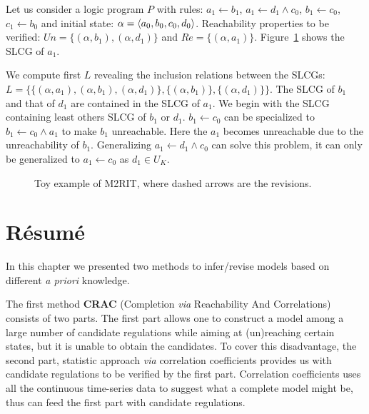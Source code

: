 \begin{example}
Let us consider a logic program $P$ with rules: $a_1\gets b_1$, $a_1\gets d_1 \land c_0$, $b_1\gets c_0$, $c_1\gets b_0$ and initial state: $\alpha=\langle a_0,b_0,c_0,d_0\rangle$.
Reachability properties to be verified: $Un=\{(\alpha,b_1),(\alpha,d_1)\}$ and $Re=\{(\alpha,a_1)\}$.
Figure~\ref{fig:toyExampleM2RIT} shows the SLCG of $a_1$.

We compute first $L$ revealing the inclusion relations between the SLCGs: $L=\{\{(\alpha,a_1),(\alpha,b_1),(\alpha,d_1)\},\{(\alpha,b_1)\},\{(\alpha,d_1)\}\}$.
The SLCG of $b_1$ and that of $d_1$ are contained in the SLCG of $a_1$.
We begin with the SLCG containing least others SLCG of $b_1$ or $d_1$.
$b_1\gets c_0$ can be specialized to $b_1\gets c_0\land a_1$ to make $b_1$ unreachable.
Here the $a_1$ becomes unreachable due to the unreachability of $b_1$.
Generalizing $a_1\gets d_1 \land c_0$ can solve this problem, it can only be generalized to $a_1 \gets c_0$ as $d_1\in U_K$.
\end{example}
    \begin{figure}[ht]
        \centering
        
        \caption[Toy example of M2RIT]{Toy example of M2RIT, where dashed arrows are the revisions.}
        \label{fig:toyExampleM2RIT}
    \end{figure}
\section{R\'esum\'e}
In this chapter we presented two methods to infer/revise models based on different \textit{a priori} knowledge.

The first method \textbf{CRAC} (Completion \textit{via} Reachability And Correlations) consists of two parts.
The first part allows one to construct a model among a large number of candidate regulations while aiming at (un)reaching certain states, but it is unable to obtain the candidates.
To cover this disadvantage, the second part, statistic approach \textit{via} correlation coefficients provides us with candidate regulations to be verified by the first part.
Correlation coefficients uses all the continuous time-series data to suggest what a complete model might be, thus can feed the first part with candidate regulations.


